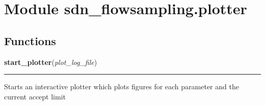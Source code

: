 %
%
%


\section{Module sdn\_flowsampling.plotter}

    \label{sdn_flowsampling:plotter}


  \subsection{Functions}

    \label{sdn_flowsampling:plotter:start_plotter}

    \vspace{0.5ex}

\hspace{.8\funcindent}\begin{boxedminipage}{\funcwidth}

    \raggedright \textbf{start\_plotter}(\textit{plot\_log\_file})

    \vspace{-1.5ex}

    \rule{\textwidth}{0.5\fboxrule}
\setlength{\parskip}{2ex}
    Starts an interactive plotter which plots figures for each parameter 
    and the current accept limit

\setlength{\parskip}{1ex}
    \end{boxedminipage}



